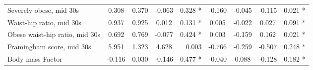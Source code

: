 \begin{tabular}{l c c c r c c c r}
Severely obese, mid 30s & 0.308 & 0.370 & -0.063 & 0.328 * & -0.160 & -0.045 & -0.115 & 0.021 * \\
Waist-hip ratio, mid 30s & 0.937 & 0.925 & 0.012 & 0.131 * & 0.005 & -0.022 & 0.027 & 0.091 * \\
Obese waist-hip ratio, mid 30s & 0.692 & 0.769 & -0.077 & 0.424 * & 0.003 & -0.159 & 0.162 & 0.021 * \\
Framingham score, mid 30s & 5.951 & 1.323 & 4.628 & 0.003 & -0.766 & -0.259 & -0.507 & 0.248 * \\
Body mass Factor & -0.116 & 0.030 & -0.146 & 0.477 * & -0.040 & 0.088 & -0.128 & 0.182 * \\
\bottomrule
\end{tabular}
